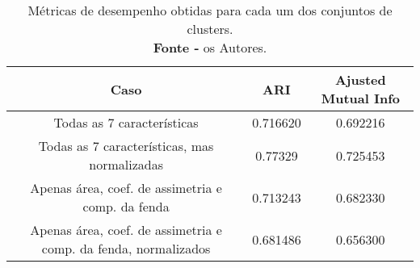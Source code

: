 \begin{table}[H]
    \centering
    \begin{tabular}{c c c} 
        \toprule
        \textbf{Caso} & \textbf{ARI} & \textbf{Ajusted Mutual Info}\\ [0.5ex] 
        \midrule
        Todas as 7 características & 0.716620 & 0.692216 \\
        \hline
        Todas as 7 características, mas normalizadas & 0.77329 & 0.725453 \\
        \hline
        Apenas área, coef. de assimetria e comp. da fenda & 0.713243 & 0.682330 \\
        \hline
        Apenas área, coef. de assimetria e comp. da fenda, normalizados & 0.681486 & 0.656300 \\
        \bottomrule
    \end{tabular}
    \caption{\label{tabela_tabuadas} Métricas de desempenho obtidas para cada um dos conjuntos de clusters. \\ \textbf{Fonte -} os Autores.}
\end{table}